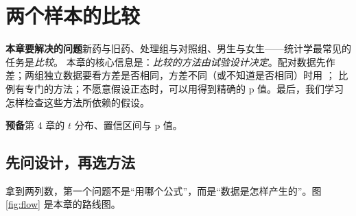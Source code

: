 \chapter{两个样本的比较}
\label{ch:twosample}

\begin{chapguide}
\textbf{\heiti 本章要解决的问题}\quad 新药与旧药、处理组与对照组、男生与女生——统计学最常见的任务是\emph{比较}。
本章的核心信息是：\emph{比较的方法由试验设计决定}。配对数据先作差；两组独立数据要看方差是否相同，方差不同（或不知道是否相同）时用 ；
比例有专门的方法；不愿意假设正态时，可以用得到精确的 p 值。最后，我们学习怎样检查这些方法所依赖的假设。\par\smallskip
\textbf{\heiti 预备}\quad 第 4 章的 $t$ 分布、置信区间与 p 值。
\end{chapguide}

\section{先问设计，再选方法}

拿到两列数，第一个问题不是“用哪个公式”，而是“数据是怎样产生的”。图 \ref{fig:flow} 是本章的路线图。

